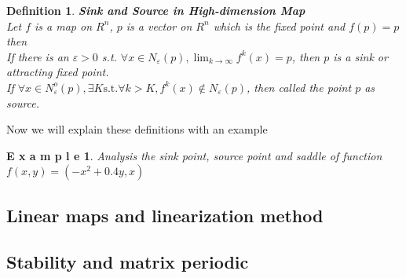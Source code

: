 \documentclass[12pt]{article}
\theoremstyle{plain}
\newtheorem{definition}{\textbf{Definition}}[section]
\newtheorem{example}{\textbf{E x a m p l e}}[section]
\begin{document}
\begin{definition}\textbf{Sink and Source in High-dimension Map}
\\\noindent Let $f$ is a map on $R^n$, $p$ is a vector on $R^n$ which is the fixed point and $f(p) = p$ then 
\\\noindent If there is an $\varepsilon > 0$ s.t. $\forall x \in N_\varepsilon(p), \lim_{k \rightarrow \infty}f^k(x) = p$, then $p$ is a sink or attracting fixed point.
\\\noindent If $\forall x \in N_\varepsilon^o(p), \exists K \text{s.t.} \forall k > K, f^k(x) \notin N_\varepsilon(p)$, then called the point $p$ as source.
\end{definition}

Now we will explain these definitions with an example

\begin{example} Analysis the sink point, source point and saddle of function $f(x, y) = (-x^2 + 0.4y, x)$
\end{example}









\subsection{Linear maps and linearization method}






\subsection{Stability and matrix periodic}
\end{document}
